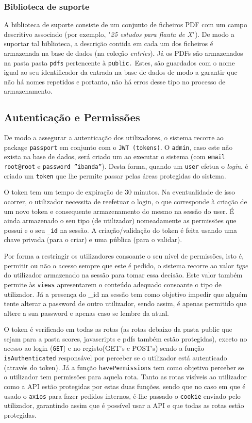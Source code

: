 \subsubsection{Biblioteca de suporte}
A biblioteca de suporte consiste de um conjunto de ficheiros PDF com um campo descritivo associado (por exemplo, "\textit{25 estudos para flauta de X}"). De modo a suportar tal biblioteca, a descrição contida em cada um dos ficheiros é armazenada na base de dados (na coleção \textit{entries}). Já os PDFs são armazenados na pasta pasta \texttt{pdfs} pertencente à \texttt{public.} Estes, são guardados com o nome igual ao seu identificador da entrada na base de dados de modo a garantir que não há nomes repetidos e portanto, não há erros desse tipo no processo de armazenamento.


\subsection{Autenticação e Permissões}
De modo a assegurar a autenticação dos utilizadores, o sistema recorre ao package \texttt{passport} em conjunto com o \texttt{JWT (tokens)}.
O \texttt{admin}, caso este não exista na base de dados, será criado um ao executar o sistema (com \texttt{email root@root} e \texttt{password ''ibanda''}).
Desta forma, quando um \texttt{user} efetua o \textit{login}, é criado um \texttt{token} que lhe permite passar pelas áreas protegidas do sistema. 

O token tem um tempo de expiração de 30 minutos. Na eventualidade de isso ocorrer, o utilizador necessita de reefetuar o login, o que corresponde à criação de um novo token e consequente armazenamento do mesmo na sessão do user. É ainda armazenado o seu tipo (de utilizador) nomeadamente as permissões que possui e o seu \texttt{\_id} na sessão. A criação/validação do token é feita usando uma chave privada (para o criar) e uma pública (para o validar).

Por forma a restringir os utilizadores consoante o seu nível de permissões, isto é, permitir ou não o acesso sempre que este é pedido, o sistema recorre ao valor \textit{type} do utilizador armazenado na sessão para tomar essa decisão. Este valor também permite às \texttt{views} apresentarem o conteúdo adequado consoante o tipo de utilizador. Já a presença do \_id na sessão tem como objetivo impedir que alguém tente alterar a password de outro utilizador, sendo assim, é apenas permitido que altere a sua password e apenas caso se lembre da atual.

O token é verificado em todas as rotas (as rotas debaixo da pasta public que sejam para a pasta scores, javascripts e pdfs também estão protegidas), exceto no acesso ao login (\texttt{GET}) e no registo(GET's e POST's) sendo a função \texttt{isAuthenticated} responsável por perceber se o utilizador está autenticado (através do token). Já a função \texttt{havePermissions} tem como objetivo perceber se o utilizador tem permissões para aquela rota. Tanto as rotas visíveis ao utilizador como a API estão protegidas por estas duas funções, sendo que no caso em que é usado o \texttt{axios} para fazer pedidos internos, é-lhe passado o \texttt{cookie} enviado pelo utilizador, garantindo assim que é possível usar a API e que todas as rotas estão protegidas.


